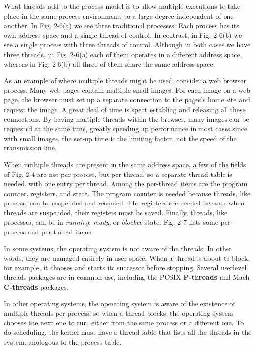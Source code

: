 \documentclass{book}
\newcommand {\kw}  [1] {\textbf{#1}}
\newcommand {\sys} [1] {\textsl{#1}}
\begin{document}
What threads add to the process model is to allow multiple executions to take place in the same process environment,
to a large degree independent of one another.
In Fig. 2-6(a) we see three traditional processes.
Each process has its own address space and a single thread of control.
In contrast, in Fig. 2-6(b) we see a single process with three threads of control.
Although in both cases we have three threads, in Fig. 2-6(a) each of them operates in a different address space, 
whereas in Fig. 2-6(b) all three of them share the same address space.

As an example of where multiple threads might be used, consider a web browser process.
Many web pages contain multiple small images.
For each image on a web page, the browser must set up a separate connection to the pages's home site and request the image.
A great deal of time is spent establing and releasing all these connections.
By having multiple threads within the browser, many images can be requested at the same time, 
greatly speeding up performance in most cases since with small images, 
the set-up time is the limiting factor, not the speed of the transmission line.

When multiple threads are present in the same address space, a few of the fields of Fig. 2-4 are not per process, but per thread,
so a separate thread table is needed, with one entry per thread.
Among the per-thread items are the program counter, registers, and state.
The program counter is needed because threads, like process, can be suspended and resumed.
The registers are needed because when threads are suspended, their registers must be saved.
Finally, threads, like processes, can be in \sys{running}, \sys{ready}, or \sys{blocked} state.
Fig. 2-7 lists some per-process and per-thread items.

In some systems, the operating system is not aware of the threads.
In other words, they are managed entirely in user space.
When a thread is about to block, for example, it chooses and starts its successor before stopping.
Several userlevel threads packages are in common use, including the POSIX \kw{P-threads} and Mach \kw{C-threads} packages.

In other operating systems, the operating system is aware of the existence of multiple threads per process,
so when a thread blocks, the operating system chooses the next one to run, either from the same process or a different one.
To do scheduling, the kernel must have a thread table that lists all the threads in the system,
anologous to the process table.
\end{document}
